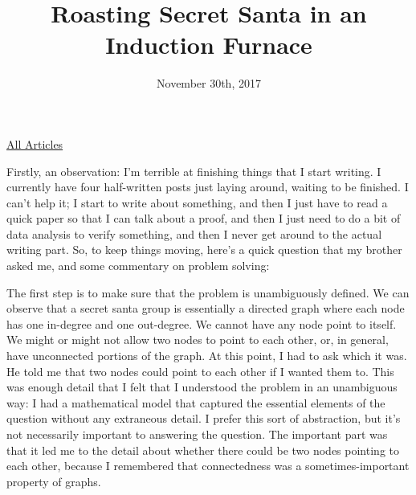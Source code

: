 \documentclass{article}
\title{Roasting Secret Santa in an Induction Furnace}
\date{November 30th, 2017}
\begin{document}
\maketitle
\begin{center}
  \href{../index.html}{All Articles}
\end{center}

Firstly, an observation: I'm terrible at finishing things that I start writing. I currently have four half-written posts just laying around, waiting to be finished. I can't help it; I start to write about something, and then I just have to read a quick paper so that I can talk about a proof, and then I just need to do a bit of data analysis to verify something, and then I never get around to the actual writing part. So, to keep things moving, here's a quick question that my brother asked me, and some commentary on problem solving:\\


The first step is to make sure that the problem is unambiguously defined. We can observe that a secret santa group is essentially a directed graph where each node has one in-degree and one out-degree. We cannot have any node point to itself. We might or might not allow two nodes to point to each other, or, in general, have unconnected portions of the graph. At this point, I had to ask which it was. He told me that two nodes could point to each other if I wanted them to. This was enough detail that I felt that I understood the problem in an unambiguous way: I had a mathematical model that captured the essential elements of the question without any extraneous detail. I prefer this sort of abstraction, but it's not necessarily important to answering the question. The important part was that it led me to the detail about whether there could be two nodes pointing to each other, because I remembered that connectedness was a sometimes-important property of graphs.\\
\end{document}
